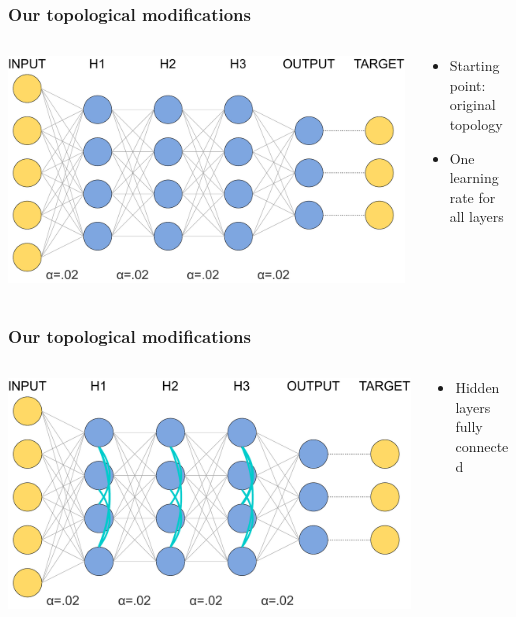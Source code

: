 \documentclass[pdf]{beamer}
\begin{document}
\begin{frame}
	\frametitle{Our topological modifications}
	\begin{columns}
		\begin{column}{.6\textwidth}
			\includegraphics[width=\textwidth]{figures/topology_changes_step1.pdf}
		\end{column}
		\begin{column}{.4\textwidth}
			\begin{itemize}
			\item<1-> Starting point: original topology
			\item<2-> One learning rate for all layers
			\end{itemize}
		\end{column}
	\end{columns}
\end{frame}
\begin{frame}
	\frametitle{Our topological modifications}
	\begin{columns}
		\begin{column}{.6\textwidth}
			\includegraphics[width=\textwidth]{figures/topology_changes_step2.pdf}
		\end{column}
		\begin{column}{.4\textwidth}
			\begin{itemize}
			\item Hidden layers fully connected
			\end{itemize}
		\end{column}
	\end{columns}
\end{frame}
\end{document}
